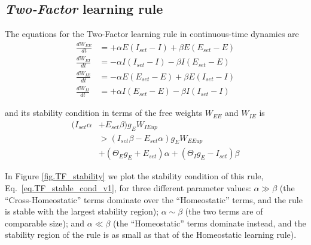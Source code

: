 \documentclass[twocolumn]{article}
\newcommand{\EE}{\mathit{EE}}
\newcommand{\EI}{\mathit{EI}}
\newcommand{\IE}{\mathit{IE}}
\newcommand{\II}{\mathit{II}}
\newcommand{\set}{\mathit{set}}
\newcommand{\up}{\mathit{up}}
\begin{document}
\subsection{{\em Two-Factor} learning rule}

The equations for the Two-Factor learning rule in continuous-time dynamics are
\begin{equation}
\begin{aligned}
\frac{dW_{\EE}}{dt} & = +\alpha E (I_{\set} - I) + \beta E (E_{\set} - E) \\
\frac{dW_{\EI}}{dt} & = -\alpha I (I_{\set} - I) - \beta I (E_{\set} - E) \\
\frac{dW_{\IE}}{dt} & = -\alpha E (E_{\set} - E) + \beta E (I_{\set} - I) \\
\frac{dW_{\II}}{dt} & = +\alpha I (E_{\set} - E) - \beta I (I_{\set} - I)
\end{aligned}
\label{eq.TF_summary}
\end{equation}

\noindent and its stability condition in terms of the free weights $W_{\EE}$ and $W_{\IE}$ is
\begin{equation}
\begin{aligned}
(I_{\set} \alpha & + E_{\set} \beta) g_E W_{\IE\up} \\
& > (I_{\set} \beta - E_{\set} \alpha) g_E W_{\EE\up} \\
& + (\Theta_E g_E + E_{\set}) \alpha + (\Theta_I g_E - I_{\set}) \beta
\end{aligned}
\label{eq.TF_stable_cond_v1}
\end{equation}

In Figure \ref{fig.TF_stability} we plot the stability condition of this rule, Eq.\ \ref{eq.TF_stable_cond_v1}, for three different parameter values: $\alpha \gg \beta$ (the ``Cross-Homeostatic'' terms dominate over the ``Homeostatic'' terms, and the rule is stable with the largest stability region); $\alpha \sim \beta$ (the two terms are of comparable size); and $\alpha \ll \beta$ (the ``Homeostatic'' terms dominate instead, and the stability region of the rule is as small as that of the Homeostatic learning rule).
\end{document}
